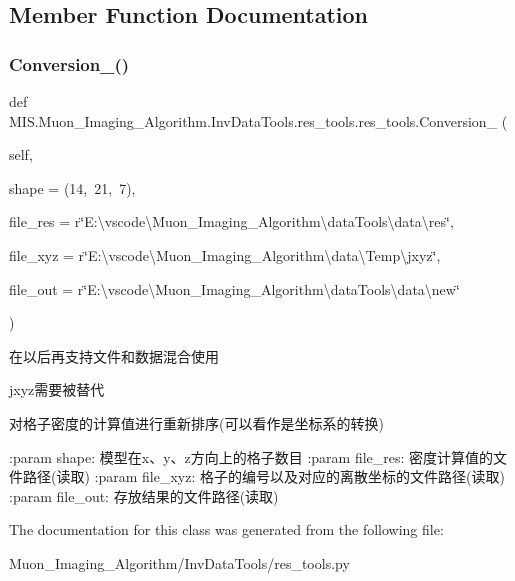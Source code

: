 \subsection{Member Function Documentation}
\mbox{\label{classMIS_1_1Muon__Imaging__Algorithm_1_1InvDataTools_1_1res__tools_1_1res__tools_a1e341a40e6d5a5c8ae4b5faf29c70f6e}} 
\subsubsection{\texorpdfstring{Conversion\+\_()}{Conversion\_2()}}
{\footnotesize\ttfamily def M\+I\+S.\+Muon\+\_\+\+Imaging\+\_\+\+Algorithm.\+Inv\+Data\+Tools.\+res\+\_\+tools.\+res\+\_\+tools.\+Conversion\+\_ (\begin{DoxyParamCaption}\item[{}]{self,  }\item[{}]{shape = {\ttfamily (14,~21,~7)},  }\item[{}]{file\+\_\+res = {\ttfamily r\char`\"{}E\+:\textbackslash{}vscode\textbackslash{}Muon\+\_\+Imaging\+\_\+Algorithm\textbackslash{}dataTools\textbackslash{}data\textbackslash{}res\char`\"{}},  }\item[{}]{file\+\_\+xyz = {\ttfamily r\char`\"{}E\+:\textbackslash{}vscode\textbackslash{}Muon\+\_\+Imaging\+\_\+Algorithm\textbackslash{}data\textbackslash{}Temp\textbackslash{}jxyz\char`\"{}},  }\item[{}]{file\+\_\+out = {\ttfamily r\char`\"{}E\+:\textbackslash{}vscode\textbackslash{}Muon\+\_\+Imaging\+\_\+Algorithm\textbackslash{}dataTools\textbackslash{}data\textbackslash{}new\char`\"{}} }\end{DoxyParamCaption})}

\begin{DoxyVerb}在以后再支持文件和数据混合使用

jxyz需要被替代

对格子密度的计算值进行重新排序(可以看作是坐标系的转换)

:param shape: 模型在x、y、z方向上的格子数目
:param file_res: 密度计算值的文件路径(读取)
:param file_xyz: 格子的编号以及对应的离散坐标的文件路径(读取)
:param file_out: 存放结果的文件路径(读取)
\end{DoxyVerb}
 

The documentation for this class was generated from the following file\+:\begin{DoxyCompactItemize}
\item 
Muon\+\_\+\+Imaging\+\_\+\+Algorithm/\+Inv\+Data\+Tools/res\+\_\+tools.\+py\end{DoxyCompactItemize}
